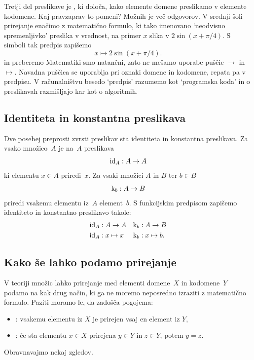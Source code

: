 Tretji del preslikave je , ki določa, kako elemente domene preslikamo v elemente
kodomene. Kaj pravzaprav to pomeni? Možnih je več odgovorov. V srednji šoli prirejanje
enačimo z matematično formulo, ki tako imenovano `neodvisno spremenljivko' preslika v vrednost, na primer $x$ slika v
$2 \sin(x + \pi/4)$. S simboli tak predpis zapišemo
%
\begin{equation*}
  x \mapsto 2 \sin(x + \pi/4).
\end{equation*}
%
in preberemo 
%
Matematiki smo natančni, zato ne mešamo uporabe puščic $\to$ in $\mapsto$. Navadna puščica
se uporablja pri oznaki domene in kodomene, repata pa v predpisu. V računalništvu besedo
`predpis' razumemo kot `programska koda' in o preslikavah razmišljajo kar kot o
algoritmih.

\subsection{Identiteta in konstantna preslikava}
\label{sec:ident-konst-presl}

Dve posebej preprosti zvrsti preslikav sta identiteta in konstantna preslikava.
Za vsako množico~$A$ je  na~$A$ preslikava
%
\begin{equation*}
  \id[A] : A \to A
\end{equation*}
%
ki elementu $x \in A$ priredi~$x$.
%
Za vsaki množici $A$ in $B$ ter $b \in B$ 
%
\begin{equation*}
  \konst{b} : A \to B
\end{equation*}
%
priredi vsakemu elementu iz~$A$ element~$b$.
%
S funkcijskim predpisom zapišemo identiteto in konstantno preslikavo takole:
%
\begin{align*}
  \id[A] &: A \to A
  &
  \konst{b} &: A \to B
  \\
  \id[A] &: x \mapsto x
  &
  \konst{b} &: x \mapsto b.
\end{align*}

\subsection{Kako še lahko podamo prirejanje}
\label{sec:drugi-nacin-prirejanje}

V teoriji množic lahko prirejanje med elementi domene~$X$ in kodomene~$Y$ podamo na kak drug način, ki ga ne moremo neposredno izraziti z matematično formulo. Paziti moramo le, da zadošča pogojema:
%
\begin{itemize}
\item {}: vsakemu elementu iz $X$ je prirejen vsaj en element iz $Y$,
\item {}: če sta elementu $x \in X$ prirejena $y \in Y$ in $z \in Y$, potem $y = z$.
\end{itemize}
%
Obravnavajmo nekaj zgledov.

